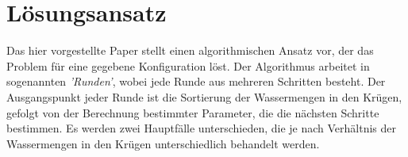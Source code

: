 \chapter{Lösungsansatz} 
Das hier vorgestellte Paper \autocite{Frei.2020} stellt einen algorithmischen Ansatz vor, der das Problem für eine gegebene Konfiguration löst. Der Algorithmus arbeitet in sogenannten \emph{'Runden'}, wobei jede Runde aus mehreren Schritten besteht. Der Ausgangspunkt jeder Runde ist die Sortierung der Wassermengen in den Krügen, gefolgt von der Berechnung bestimmter Parameter, die die nächsten Schritte bestimmen. Es werden zwei Hauptfälle unterschieden, die je nach Verhältnis der Wassermengen in den Krügen unterschiedlich behandelt werden.




